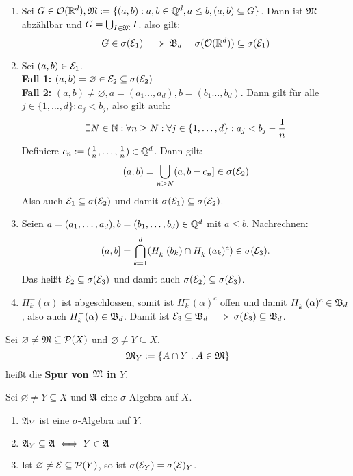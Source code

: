 \documentclass[a4paper,twoside,DIV15,BCOR12mm,chapterprefix=true,headings=onelinechapter]{scrbook}
\begin{document}
\begin{beweis}
\begin{enumerate}
\item Sei $G\in\mathcal{O}(\mathbb{R}^d), \mathfrak{M}:=\{(a,b):a,b\in\mathbb{Q}^d,a\le b, (a,b)\subseteq G\}$. Dann ist $\mathfrak{M}$ abzählbar und $G=\bigcup_{I\in\mathfrak{M}}I$. also gilt:
\[G\in\sigma(\mathcal{E}_1)\implies \mathfrak{B}_d=\sigma(\mathcal{O}(\mathbb{R}^d))\subseteq\sigma(\mathcal{E}_1)\]
\item Sei $(a,b)\in\mathcal{E}_1$.\\
\textbf{Fall 1:} $(a,b)=\varnothing\in\mathcal{E}_2\subseteq\sigma(\mathcal{E}_2)$\\
\textbf{Fall 2:} $(a,b)\ne\varnothing, a=(a_1\ldots,a_d), b=(b_1\ldots,b_d)$. Dann gilt für alle $j\in\{1,\ldots,d\}:a_j<b_j$, also gilt auch:
\[\exists N\in\mathbb{N}:\forall n\ge N: \forall j\in\{1,\ldots,d\}:a_j<b_j-\frac1n\]
Definiere $c_n:=(\frac1n,\ldots,\frac1n)\in\mathbb{Q}^d$. Dann gilt:
\[(a,b)=\bigcup_{n\ge N}(a,b-c_n]\in\sigma(\mathcal{E}_2)\]
Also auch $\mathcal{E}_1\subseteq\sigma(\mathcal{E}_2)$ und damit $\sigma(\mathcal{E}_1)\subseteq\sigma(\mathcal{E}_2)$.
\item Seien $a = (a_1,\ldots,a_d), b=(b_1,\ldots,b_d) \in \mathbb{Q}^d$ mit $a \leq b$. Nachrechnen:
\[(a,b] = \bigcap_{k=1}^d (H^-_k(b_k) \cap H^-_k(a_k)^c) \in \sigma(\mathcal{E}_3). \]
Das heißt $\mathcal{E}_2 \subseteq \sigma(\mathcal{E}_3)$ und damit auch $\sigma(\mathcal{E}_2) \subseteq \sigma(\mathcal{E}_3)$. 
\item $H^-_k(\alpha)$ ist abgeschlossen, somit ist $H^-_k(\alpha)^c$ offen und damit $H^-_k(\alpha)^c \in \mathfrak{B}_d$, also auch $H^-_k(\alpha) \in \mathfrak{B}_d$. Damit ist $\mathcal{E}_3 \subseteq \mathfrak{B}_d \implies \sigma(\mathcal{E}_3) \subseteq \mathfrak{B}_d$. 
\end{enumerate}
\end{beweis}

\begin{definition}
Sei $\varnothing \neq \mathfrak{M} \subseteq \mathcal{P}(X)$ und $\varnothing \neq Y \subseteq X$. 
\[\mathfrak{M}_Y := \{A \cap Y : A \in \mathfrak{M}\}\] 
heißt die \textbf{Spur von $\mathfrak{M}$ in $Y$}.
\end{definition}

\begin{satz}
\label{Satz 1.5}
Sei $\varnothing \neq Y \subseteq X$ und $\mathfrak{A}$ eine $\sigma$-Algebra auf $X$.
\begin{enumerate}
\item $\mathfrak{A}_Y$ ist eine $\sigma$-Algebra auf $Y$.
\item $\mathfrak{A}_Y \subseteq \mathfrak{A} \iff Y \in \mathfrak{A}$
\item Ist $\varnothing \neq \mathcal{E} \subseteq \mathcal{P}(Y)$, so ist $\sigma(\mathcal{E}_Y) = \sigma(\mathcal{E})_Y$.
\end{enumerate}
\end{satz}
\end{document}
